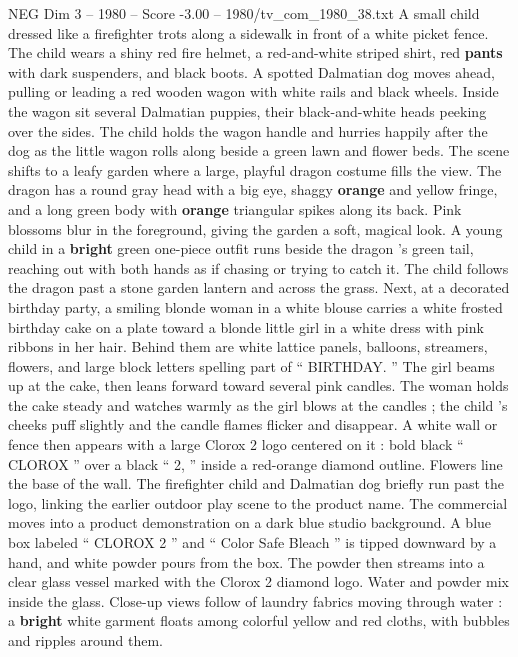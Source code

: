 \begin{textsample}{NEG Dim 3 – 1980 – Score -3.00 – 1980/tv\_com\_1980\_38.txt}  \label{ex:f3_neg_051}
A small child dressed like a firefighter trots along a sidewalk in front of a white picket fence.
The child wears a shiny red fire helmet, a red-and-white striped shirt, red \textbf{pants} with dark suspenders, and black boots.
A spotted Dalmatian dog moves ahead, pulling or leading a red wooden wagon with white rails and black wheels.
Inside the wagon sit several Dalmatian puppies, their black-and-white heads peeking over the sides.
The child holds the wagon handle and hurries happily after the dog as the little wagon rolls along beside a green lawn and flower beds.
The scene shifts to a leafy garden where a large, playful dragon costume fills the view.
The dragon has a round gray head with a big eye, shaggy \textbf{orange} and yellow fringe, and a long green body with \textbf{orange} triangular spikes along its back.
Pink blossoms blur in the foreground, giving the garden a soft, magical look.
A young child in a \textbf{bright} green one-piece outfit runs beside the dragon ’s green tail, reaching out with both hands as if chasing or trying to catch it.
The child follows the dragon past a stone garden lantern and across the grass.
Next, at a decorated birthday party, a smiling blonde woman in a white blouse carries a white frosted birthday cake on a plate toward a blonde little girl in a white dress with pink ribbons in her hair.
Behind them are white lattice panels, balloons, streamers, flowers, and large block letters spelling part of “ BIRTHDAY. ” The girl beams up at the cake, then leans forward toward several pink candles.
The woman holds the cake steady and watches warmly as the girl blows at the candles ; the child ’s cheeks puff slightly and the candle flames flicker and disappear.
A white wall or fence then appears with a large Clorox 2 logo centered on it : bold black “ CLOROX ” over a black “ 2, ” inside a red-orange diamond outline.
Flowers line the base of the wall.
The firefighter child and Dalmatian dog briefly run past the logo, linking the earlier outdoor play scene to the product name.
The commercial moves into a product demonstration on a dark blue studio background.
A blue box labeled “ CLOROX 2 ” and “ Color Safe Bleach ” is tipped downward by a hand, and white powder pours from the box.
The powder then streams into a clear glass vessel marked with the Clorox 2 diamond logo.
Water and powder mix inside the glass.
Close-up views follow of laundry fabrics moving through water : a \textbf{bright} white garment floats among colorful yellow and red cloths, with bubbles and ripples around them.

\end{textsample}
